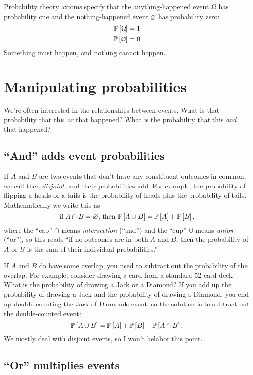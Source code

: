 Probability theory axioms specify that the anything-happened event $\Omega$ has
probability one and the nothing-happened event $\varnothing$ has probability zero:
\begin{align*}
\mathbb{P}\left[{\Omega}\right] &= 1 \\
\mathbb{P}\left[{\varnothing}\right] &= 0
\end{align*}
Something must happen, and nothing cannot happen.

\section{Manipulating probabilities}

We're often interested in the relationships between events. What is that
probability that this \emph{or} that happened? What is the probability that
this \emph{and} that happened?

\subsection{``And'' adds event probabilities}

If $A$ and $B$ are two events that don't have any constituent outcomes in
common, we call then \emph{disjoint}, and their probabilities add. For
example, the probability of flipping a heads or a tails is
the probability of heads plus the probability of tails.
Mathematically we write this as
$$
\text{if } A \cap B = \varnothing \text{, then } \mathbb{P}\left[{A \cup B}\right] = \mathbb{P}\left[{A}\right] + \mathbb{P}\left[{B}\right],
$$
where the ``cap'' $\cap$ means \emph{intersection} (``and'') and the ``cup'' $\cup$ means
\emph{union} (``or''), so this reads ``if no outcomes are in both $A$ and $B$,
then the probability of $A$ or $B$ is the sum of their individual probabilities.''

If $A$ and $B$ do have some overlap, you need to subtract out the probability
of the overlap. For example, consider drawing a card
from a standard 52-card deck. What is the probability of drawing a Jack or a
Diamond? If you add up the probability of drawing a Jack and the probability
of drawing a Diamond, you end up double-counting the Jack of Diamonds event,
so the solution is to subtract out the double-counted event:
$$
\mathbb{P}\left[{A \cup B}\right] = \mathbb{P}\left[{A}\right] + \mathbb{P}\left[{B}\right] - \mathbb{P}\left[{A \cap B}\right].
$$
We mostly deal with disjoint events, so I won't belabor this point.

\subsection{``Or'' multiplies events}

